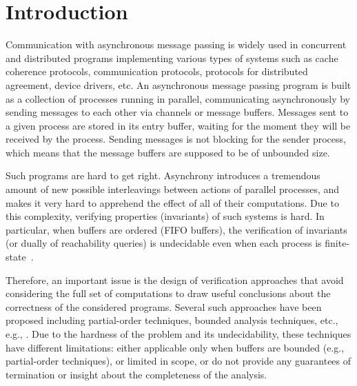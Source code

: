 \section{Introduction}

Communication with asynchronous message passing is widely used in concurrent and distributed programs implementing various types of systems such as cache coherence protocols, communication protocols, protocols for distributed agreement, device drivers, etc. 
%
An asynchronous message passing program is built as a collection of processes running in parallel, communicating asynchronously by sending messages to each other via channels or message buffers. Messages sent to a given process are stored in its entry buffer, waiting for the moment they will be received by the process. Sending messages is not blocking for the sender process, which means that the message buffers are supposed to be of unbounded size. 

Such programs are hard to get right. Asynchrony introduces a tremendous amount of new possible interleavings between actions of parallel processes, and makes it very hard to apprehend the effect of all of their computations. %
Due to this complexity, verifying properties (invariants) of such systems is hard. In particular, when buffers are ordered (FIFO buffers), the verification of invariants (or dually of reachability queries) is undecidable even when each process is finite-state~\cite{DBLP:journals/jacm/BrandZ83}.

Therefore, an important issue is the design of verification approaches that avoid considering the full set of computations 
to draw useful conclusions about the correctness of the considered programs. Several such approaches have been proposed including partial-order techniques, bounded analysis techniques, etc., e.g., \cite{DBLP:journals/tcs/BasuB16,DBLP:conf/oopsla/Desai0M14,DBLP:conf/tacas/BouajjaniE12,DBLP:conf/tacas/TorreMP08,DBLP:conf/popl/FlanaganG05}. Due to the hardness of the problem and its undecidability, these techniques have different limitations: either applicable only when buffers are bounded (e.g., partial-order techniques), or limited in scope, or do not provide any guarantees of termination or insight about the completeness of the analysis.


